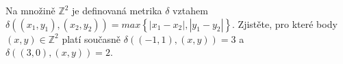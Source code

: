 Na množině $\mathbb{Z}^{2}$ je definovaná metrika $\delta$ vztahem $\delta
((x_{1},y_{1}), (x_{2},y_{2})) = max \left \{ \left | x_{1}-x_{2} \right |,\left
| y_{1}-y_{2} \right | \right \}$. Zjistěte, pro které body $(x,y) \in
\mathbb{Z}^{2}$ platí současně $\delta ((-1,1), (x,y))= 3$ a
$\delta((3,0),(x,y))=2$.
